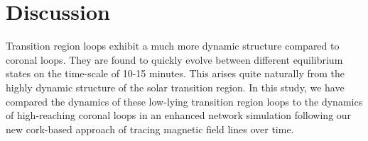 \documentclass{aa}
\begin{document}
{%









\section{Discussion}\label{discussion}
Transition region loops exhibit a much more dynamic structure compared to coronal loops. They are found to quickly evolve between different equilibrium states on the time-scale of 10-15 minutes. This arises quite naturally from the highly dynamic structure of the solar transition region. In this study, we have compared the dynamics of these low-lying transition region loops to the dynamics of high-reaching coronal loops in an enhanced network simulation following our new cork-based approach of tracing magnetic field lines over time. 

}
\end{document}
